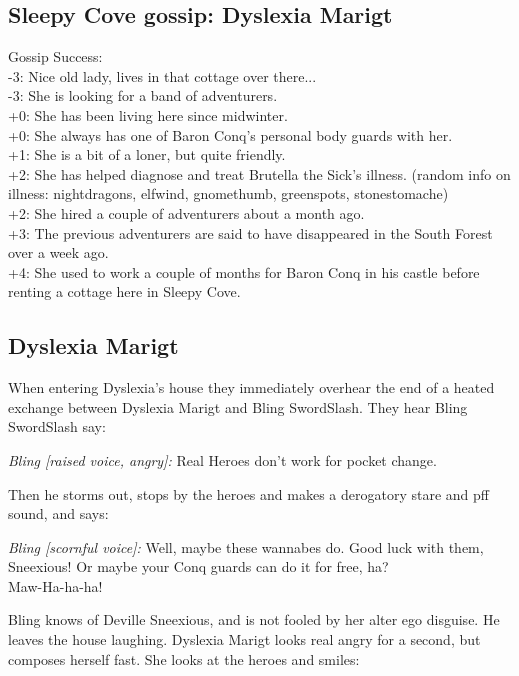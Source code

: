 \subsection*{Sleepy Cove gossip: Dyslexia Marigt}
Gossip Success:\\
-3: Nice old lady, lives in that cottage over there...\\
-3: She is looking for a band of adventurers. \\
+0: She has been living here since midwinter. \\
+0: She always has one of Baron Conq's personal body guards with her. \\
+1: She is a bit of a loner, but quite friendly. \\
+2: She has helped diagnose and treat Brutella the Sick's illness. (random info on illness: nightdragons, elfwind, gnomethumb, greenspots, stonestomache) \\
+2: She hired a couple of adventurers about a month ago. \\
+3: The previous adventurers are said to have disappeared in the South Forest over a week ago. \\
+4: She used to work a couple of months for Baron Conq in his castle before renting a cottage here in Sleepy Cove. \\


\subsection*{Dyslexia Marigt}
When entering Dyslexia's house they immediately overhear the end of a heated exchange between Dyslexia Marigt and Bling SwordSlash. They hear Bling SwordSlash say:
\begin{readoutloud}
\emph{Bling [raised voice, angry]:} Real Heroes don't work for pocket change.
\end{readoutloud}
Then he storms out, stops by the heroes and makes a derogatory stare and pff sound, and says:
\begin{readoutloud}
\emph{Bling [scornful voice]:} Well, maybe these wannabes do. Good luck with them, Sneexious! Or maybe your Conq guards can do it for free, ha? \\
Maw-Ha-ha-ha!
\end{readoutloud}

Bling knows of Deville Sneexious, and is not fooled by her alter ego disguise. He leaves the house laughing.
Dyslexia Marigt looks real angry for a second, but composes herself fast. She looks at the heroes and smiles:

